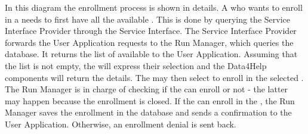 \documentclass[../../DD.tex]{subfiles}
\begin{document}
	In this diagram the  enrollment process is shown in details. A  who wants to enroll in a  needs to first have all the available . This is done by querying the Service Interface Provider through the Service Interface. The Service Interface Provider forwards the User Application requests to the Run Manager, which queries the database. It returns the list of available  to the User Application. Assuming that the list is not empty, the  will express their selection and the Data4Help components will return the  details. The  may then select to enroll in the selected . The Run Manager is in charge of checking if the  can enroll or not - the latter may happen because the enrollment is closed. If the  can enroll in the , the Run Manager saves the enrollment in the database and sends a confirmation to the User Application. Otherwise, an enrollment denial is sent back.
\end{document}
